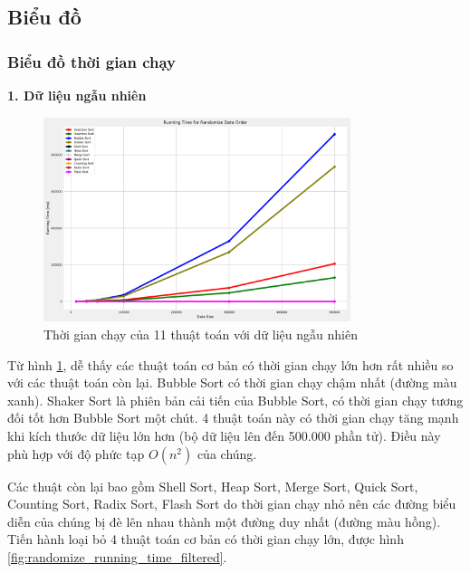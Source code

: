 \subsection{Biểu đồ}
\subsubsection{Biểu đồ thời gian chạy}

\textbf{1. Dữ liệu ngẫu nhiên}

\begin{figure}[H]
    \centering
    \includegraphics[width=0.8\textwidth]{experimental_result/images/randomize_running_time.png}
    \caption{Thời gian chạy của 11 thuật toán với dữ liệu ngẫu nhiên}
    \label{fig:randomize_running_time}
\end{figure}

Từ hình \ref{fig:randomize_running_time}, dễ thấy các thuật toán cơ bản có thời gian chạy lớn hơn rất nhiều so với các thuật toán còn lại. Bubble Sort có thời gian chạy chậm nhất (đường màu xanh). Shaker Sort là phiên bản cải tiến của Bubble Sort, có thời gian chạy tương đối tốt hơn Bubble Sort một chút. 4 thuật toán này có thời gian chạy tăng mạnh khi kích thước dữ liệu lớn hơn (bộ dữ liệu lên đến 500.000 phần tử). Điều này phù hợp với độ phức tạp $O(n^2)$ của chúng.


Các thuật còn lại bao gồm Shell Sort, Heap Sort, Merge Sort, Quick Sort, Counting Sort, Radix Sort, Flash Sort do thời gian chạy nhỏ nên các đường biểu diễn của chúng bị đè lên nhau thành một đường duy nhất (đường màu hồng). Tiến hành loại bỏ 4 thuật toán cơ bản có thời gian chạy lớn, được hình \ref{fig:randomize_running_time_filtered}.


